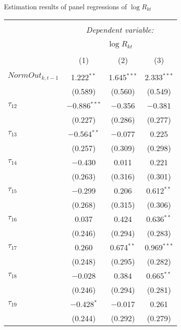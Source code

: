   \caption{Estimation results of panel regressions of $\log R_{kt}$} 
  \label{} 
\small 
\begin{tabular}{@{\extracolsep{5pt}}lccc} 
\\[-1.8ex]\hline 
\hline \\[-1.8ex] 
 & \multicolumn{3}{c}{\textit{Dependent variable:}} \\ 
\cline{2-4} 
\\[-1.8ex] & \multicolumn{3}{c}{$\log R_{kt}$} \\ 
\\[-1.8ex] & (1) & (2) & (3)\\ 
\hline \\[-1.8ex] 
 $NormOut_{k,t-1}$ & 1.222$^{**}$ & 1.645$^{***}$ & 2.333$^{***}$ \\ 
  & (0.589) & (0.560) & (0.549) \\ 
   
 $\tau_{12}$ & $-$0.886$^{***}$ & $-$0.356 & $-$0.381 \\ 
  & (0.227) & (0.286) & (0.277) \\ 
   
 $\tau_{13}$ & $-$0.564$^{**}$ & $-$0.077 & 0.225 \\ 
  & (0.257) & (0.309) & (0.298) \\ 
   
 $\tau_{14}$ & $-$0.430 & 0.011 & 0.221 \\ 
  & (0.263) & (0.316) & (0.301) \\ 
   
 $\tau_{15}$ & $-$0.299 & 0.206 & 0.612$^{**}$ \\ 
  & (0.268) & (0.315) & (0.306) \\ 
   
 $\tau_{16}$ & 0.037 & 0.424 & 0.636$^{**}$ \\ 
  & (0.246) & (0.294) & (0.283) \\ 
   
 $\tau_{17}$ & 0.260 & 0.674$^{**}$ & 0.969$^{***}$ \\ 
  & (0.248) & (0.295) & (0.282) \\ 
   
 $\tau_{18}$ & $-$0.028 & 0.384 & 0.665$^{**}$ \\ 
  & (0.246) & (0.294) & (0.281) \\ 
   
 $\tau_{19}$ & $-$0.428$^{*}$ & $-$0.017 & 0.261 \\ 
  & (0.244) & (0.292) & (0.279) \\ 
   

\end{tabular}
